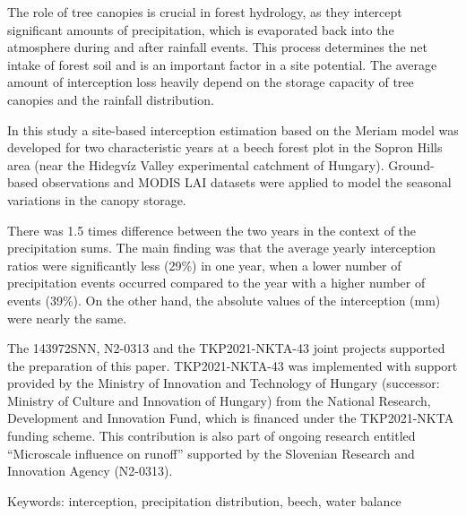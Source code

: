 \noindent

The role of tree canopies is crucial in forest hydrology, as they intercept significant amounts of precipitation, which is evaporated back into the atmosphere during and after rainfall events. This process determines the net intake of forest soil and is an important factor in a site potential. The average amount of interception loss heavily depend on the storage capacity of tree canopies and the rainfall distribution.

In this study a site-based interception estimation based on the Meriam model was developed for two characteristic years at a beech forest plot in the Sopron Hills area (near the Hidegvíz Valley experimental catchment of Hungary). Ground-based observations and MODIS LAI datasets were applied to model the seasonal variations in the canopy storage. 

There was 1.5 times difference between the two years in the context of the precipitation sums. The main finding was that the average yearly interception ratios were significantly less (29\%) in one year, when a lower number of precipitation events occurred compared to the year with a higher number of events (39\%). On the other hand, the absolute values of the interception (mm) were nearly the same.

The 143972SNN, N2-0313 and the TKP2021-NKTA-43 joint projects supported the preparation of this paper. TKP2021-NKTA-43 was implemented with support provided by the Ministry of Innovation and Technology of Hungary (successor: Ministry of Culture and Innovation of Hungary) from the National Research, Development and Innovation Fund, which is financed under the TKP2021-NKTA funding scheme. This contribution is also part of ongoing research entitled “Microscale influence on runoff” supported by the Slovenian Research and Innovation Agency (N2-0313).

Keywords: interception, precipitation distribution, beech, water balance
\newpage{}
{}
\begin{flushleft}






\end{flushleft}

